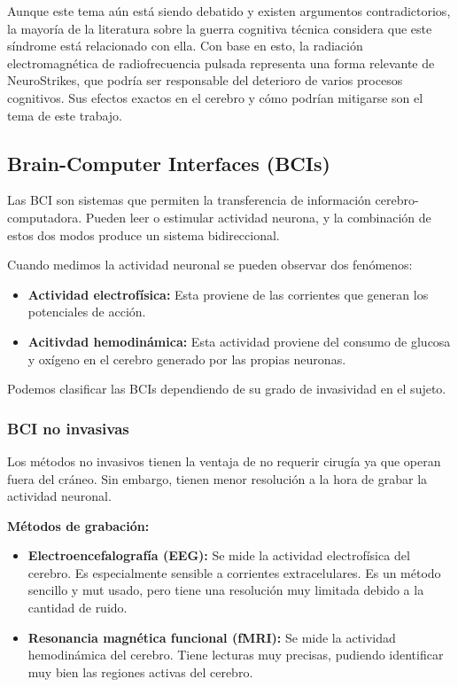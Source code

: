 \documentclass[12pt, letterpaper]{article}
\begin{document}
Aunque este tema aún está siendo debatido y existen argumentos contradictorios, la mayoría de la literatura sobre la guerra cognitiva técnica considera que este síndrome está relacionado con ella. Con base en esto, la radiación electromagnética de radiofrecuencia pulsada representa una forma relevante de NeuroStrikes, que podría ser responsable del deterioro de varios procesos cognitivos. Sus efectos exactos en el cerebro y cómo podrían mitigarse son el tema de este trabajo.

\subsection{Brain-Computer Interfaces (BCIs)}
Las BCI son sistemas que permiten la transferencia de información cerebro-computadora. Pueden leer o estimular actividad neurona, y la combinación de estos dos modos produce un sistema bidireccional.

Cuando medimos la actividad neuronal se pueden observar dos fenómenos:
\begin{itemize}
    \item \textbf{Actividad electrofísica:} Esta proviene de las corrientes que generan los potenciales de acción.
    \item \textbf{Acitivdad hemodinámica:} Esta actividad proviene del consumo de glucosa y oxígeno en el cerebro generado por las propias neuronas.
\end{itemize}

Podemos clasificar las BCIs dependiendo de su grado de invasividad en el sujeto.

\subsubsection{BCI no invasivas}
Los métodos no invasivos tienen la ventaja de no requerir cirugía ya que operan fuera del cráneo. Sin embargo, tienen menor resolución a la hora de grabar la actividad neuronal.

\textbf{Métodos de grabación:}
\begin{itemize}
    \item \textbf{Electroencefalografía (EEG):} Se mide la actividad electrofísica del cerebro. Es especialmente sensible a corrientes extracelulares. Es un método sencillo y mut usado, pero tiene una resolución muy limitada debido a la cantidad de ruido.
    \item \textbf{Resonancia magnética funcional (fMRI):} Se mide la actividad hemodinámica del cerebro. Tiene lecturas muy precisas, pudiendo identificar muy bien las regiones activas del cerebro.
\end{itemize}
\end{document}
